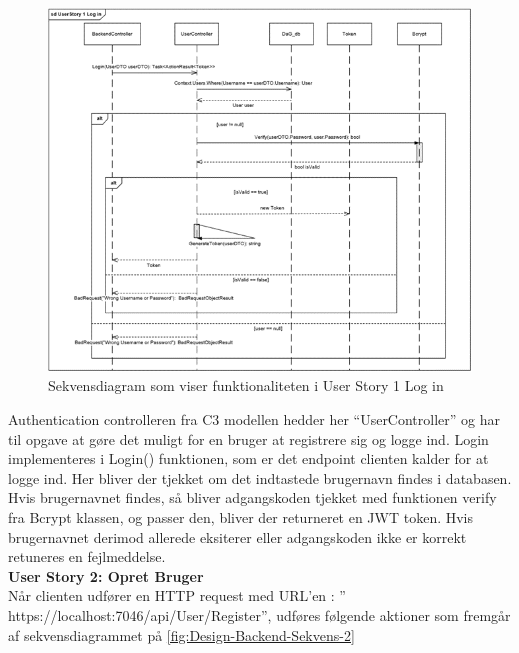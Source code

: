 \begin{figure}[H]
\centering
\includegraphics[width = \textwidth]{02-Body/Images/Backend_sekvens_1.PNG}
\caption{Sekvensdiagram som viser funktionaliteten i User Story 1 Log in}
\label{fig:Design-Backend-Sekvens-1}
\end{figure}

Authentication controlleren fra C3 modellen hedder her “UserController” og har til opgave at gøre det muligt for en bruger at registrere sig og logge ind. Login implementeres i Login() funktionen, som er det endpoint clienten kalder for at logge ind. Her bliver der tjekket om det indtastede brugernavn findes i databasen. Hvis brugernavnet findes, så bliver adgangskoden tjekket med funktionen verify fra Bcrypt klassen, og passer den, bliver der returneret en JWT token. Hvis brugernavnet derimod allerede eksiterer eller adgangskoden ikke er korrekt retuneres en fejlmeddelse.\\

\textbf{User Story 2: Opret Bruger}\\
Når clienten udfører en HTTP request med URL’en : ” https://localhost:7046/api/User/Register”, udføres følgende aktioner som fremgår af sekvensdiagrammet på \autoref{fig:Design-Backend-Sekvens-2}\\

